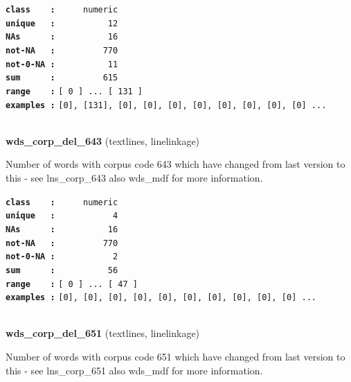 \documentclass[]{article}
\begin{document}
\textbf{\texttt{class\ \ \ \ :}} \texttt{~~~~~numeric}\\
\textbf{\texttt{unique\ \ \ :}} \texttt{~~~~~~~~~~12}\\
\textbf{\texttt{NAs\ \ \ \ \ \ :}} \texttt{~~~~~~~~~~16}\\
\textbf{\texttt{not-NA\ \ \ :}} \texttt{~~~~~~~~~770}\\
\textbf{\texttt{not-0-NA\ :}} \texttt{~~~~~~~~~~11}\\
\textbf{\texttt{sum\ \ \ \ \ \ :}} \texttt{~~~~~~~~~615}\\
\textbf{\texttt{range\ \ \ \ :}}
\texttt{{[}\ 0\ {]}\ ...\ {[}\ 131\ {]}}\\
\textbf{\texttt{examples\ :}}
\texttt{{[}0{]},\ {[}131{]},\ {[}0{]},\ {[}0{]},\ {[}0{]},\ {[}0{]},\ {[}0{]},\ {[}0{]},\ {[}0{]},\ {[}0{]}\ ...}\\

~

\textbf{wds\_corp\_del\_643} (textlines, linelinkage)

Number of words with corpus code 643 which have changed from last
version to this - see lns\_corp\_643 also wds\_mdf for more information.

\textbf{\texttt{class\ \ \ \ :}} \texttt{~~~~~numeric}\\
\textbf{\texttt{unique\ \ \ :}} \texttt{~~~~~~~~~~~4}\\
\textbf{\texttt{NAs\ \ \ \ \ \ :}} \texttt{~~~~~~~~~~16}\\
\textbf{\texttt{not-NA\ \ \ :}} \texttt{~~~~~~~~~770}\\
\textbf{\texttt{not-0-NA\ :}} \texttt{~~~~~~~~~~~2}\\
\textbf{\texttt{sum\ \ \ \ \ \ :}} \texttt{~~~~~~~~~~56}\\
\textbf{\texttt{range\ \ \ \ :}}
\texttt{{[}\ 0\ {]}\ ...\ {[}\ 47\ {]}}\\
\textbf{\texttt{examples\ :}}
\texttt{{[}0{]},\ {[}0{]},\ {[}0{]},\ {[}0{]},\ {[}0{]},\ {[}0{]},\ {[}0{]},\ {[}0{]},\ {[}0{]},\ {[}0{]}\ ...}\\

~

\textbf{wds\_corp\_del\_651} (textlines, linelinkage)

Number of words with corpus code 651 which have changed from last
version to this - see lns\_corp\_651 also wds\_mdf for more information.
\end{document}

